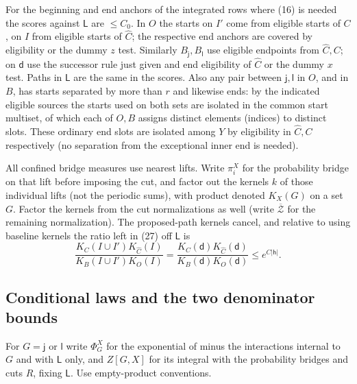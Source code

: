 For the beginning and end anchors of the integrated rows where (16) is needed the scores against \(\mathsf L\) are \(\le C_0\). In \(O\) the starts on \(I'\) come from eligible starts of \(C\), on \(I\) from eligible starts of \(\widehat C\); the respective end anchors are covered by eligibility or the dummy \(z\) test. Similarly \(B_{\mathsf j},B_{\mathsf l}\) use eligible endpoints from \(\widehat C,C\); on \(\mathsf d\) use the successor rule just given and end eligibility of \(\widehat C\) or the dummy \(x\) test. Paths in \(\mathsf L\) are the same in the scores. Also any pair between \(\mathsf j,\mathsf l\) in \(O\), and in \(B\), has starts separated by more than \(r\) and likewise ends: by the indicated eligible sources the starts used on both sets are isolated in the common start multiset, of which each of \(O,B\) assigns distinct elements (indices) to distinct slots. These ordinary end slots are isolated among \(Y\) by eligibility in \(\widehat C,C\) respectively (no separation from the exceptional inner end is needed).

All confined bridge measures use nearest lifts. Write \(\pi_i^X\) for the probability bridge on that lift before imposing the cut, and factor out the kernels \(k\) of those individual lifts (not the periodic sums), with product denoted \(K_X(G)\) on a set \(G\). Factor the kernels from the cut normalizations as well (write \(\overline{\mathcal Z}\) for the remaining normalization). The proposed-path kernels cancel, and relative to using baseline kernels the ratio left in (27) off \(\mathsf L\) is
\[
 \frac{K_C(I\cup I') K_{\widehat C}(I)}{K_B(I\cup I') K_O(I)}
      =\frac{K_C(\mathsf d)K_{\widehat C}(\mathsf d)}
             {K_B(\mathsf d)K_O(\mathsf d)}\le e^{C|\mathsf h|}.      \tag{28}\label{eq:28}
\]

\subsection{Conditional laws and the two denominator bounds}

For \(G=\mathsf j\) or \(\mathsf l\) write \(\Phi_G^X\) for the exponential of minus the interactions internal to \(G\) and with \(\mathsf L\) only, and \(Z[G,X]\) for its integral with the probability bridges and cuts \(R\), fixing \(\mathsf L\). Use empty-product conventions.

